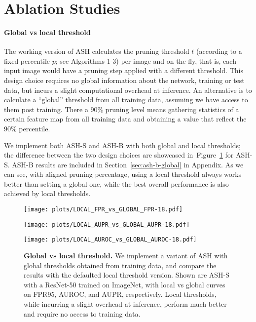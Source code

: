 \documentclass{article}
\newcommand{\figlabel}[1]{\label{fig:#1}}
\newcommand{\figref}[1]{Figure~\ref{fig:#1}}
\newcommand{\seclabel}[1]{\label{sec:#1}}
\newcommand{\secref}[1]{Section~\ref{sec:#1}}
\begin{document}
\section{Ablation Studies}
\seclabel{discuss}



\paragraph{Global vs local threshold} The working version of ASH calculates the pruning threshold $t$ (according to a fixed percentile $p$; see Algorithms 1-3) per-image and on the fly, that is, each input image would have a pruning step applied with a different threshold. This design choice requires no global information about the network, training or test data, but incurs a slight computational overhead at inference. An alternative is to calculate a ``global'' threshold from all training data, assuming we have access to them post training. There a 90\% pruning level means gathering statistics of a certain feature map from all training data and obtaining a value that reflect the 90\% percentile.

We implement both ASH-S and ASH-B with both global and local thresholds; the difference between the two design choices are showcased in~\figref{global_vs_local} for ASH-S. ASH-B results are included in \secref{ash-b-global} in Appendix. As we can see, with aligned pruning percentage, using a local threshold always works better than setting a global one, while the best overall performance is also achieved by local thresholds. 



\begin{figure}[hbt!]
 \centering
\begin{minipage}[b]{0.28\textwidth}
        \captionsetup{labelformat=empty}
\texttt{[image: plots/LOCAL\_FPR\_vs\_GLOBAL\_FPR-18.pdf]}
\subcaption{}{}
    \end{minipage}
\begin{minipage}[b]{0.28\textwidth}
        \captionsetup{labelformat=empty}
       

        \texttt{[image: plots/LOCAL\_AUPR\_vs\_GLOBAL\_AUPR-18.pdf]}
\subcaption{}{}
    \end{minipage}
\begin{minipage}[b]{0.28\textwidth}
        \captionsetup{labelformat=empty}
\texttt{[image: plots/LOCAL\_AUROC\_vs\_GLOBAL\_AUROC-18.pdf]}
\subcaption{}{}
    \end{minipage}
\caption{\textbf{Global vs local threshold.} We implement a variant of ASH with global thresholds obtained from training data, and compare the results with the defaulted local threshold version. Shown are ASH-S with a ResNet-50 trained on ImageNet, with local vs global curves on FPR95, AUROC, and AUPR, respectively. Local thresholds, while incurring a slight overhead at inference, perform much better and require no access to training data.
    }
    \figlabel{global_vs_local}
\end{figure}
\end{document}

